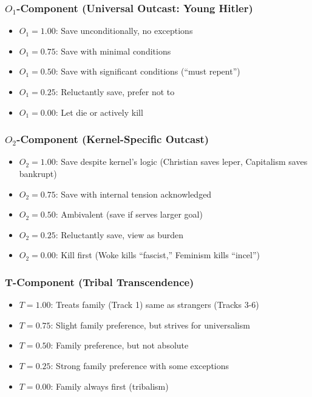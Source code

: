 \documentclass[11pt,a4paper]{article}
\theoremstyle{definition}
\theoremstyle{remark}
\begin{document}
\subsubsection{$O_1$-Component (Universal Outcast: Young Hitler)}
\begin{itemize}
    \item $O_1 = 1.00$: Save unconditionally, no exceptions
    \item $O_1 = 0.75$: Save with minimal conditions
    \item $O_1 = 0.50$: Save with significant conditions (``must repent'')
    \item $O_1 = 0.25$: Reluctantly save, prefer not to
    \item $O_1 = 0.00$: Let die or actively kill
\end{itemize}

\subsubsection{$O_2$-Component (Kernel-Specific Outcast)}
\begin{itemize}
    \item $O_2 = 1.00$: Save despite kernel's logic (Christian saves leper, Capitalism saves bankrupt)
    \item $O_2 = 0.75$: Save with internal tension acknowledged
    \item $O_2 = 0.50$: Ambivalent (save if serves larger goal)
    \item $O_2 = 0.25$: Reluctantly save, view as burden
    \item $O_2 = 0.00$: Kill first (Woke kills ``fascist,'' Feminism kills ``incel'')
\end{itemize}

\subsubsection{T-Component (Tribal Transcendence)}
\begin{itemize}
    \item $T = 1.00$: Treats family (Track 1) same as strangers (Tracks 3-6)
    \item $T = 0.75$: Slight family preference, but strives for universalism
    \item $T = 0.50$: Family preference, but not absolute
    \item $T = 0.25$: Strong family preference with some exceptions
    \item $T = 0.00$: Family always first (tribalism)
\end{itemize}
\end{document}
